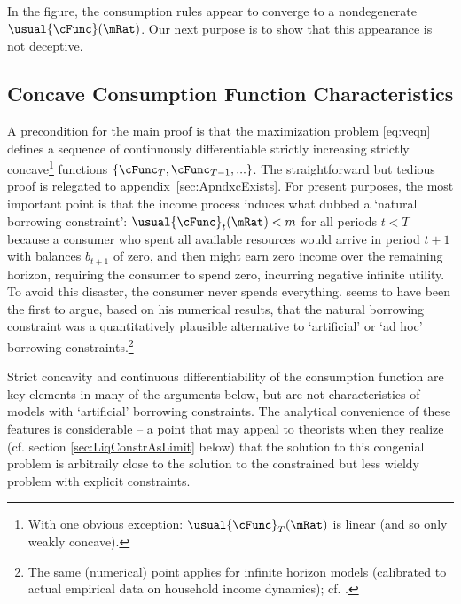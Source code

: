 \documentclass[BufferStockTheory]{subfiles}
\begin{document}
\hypertarget{Calibration}{}



\hypertarget{Symbols}{}



\providecommand{\figName}{Convergence-of-the-Consumption-Rules} %
\providecommand{\figFile}{cFuncsConverge} %
\hypertarget{\figFile}{}
\hypertarget{\figName}{}

In the figure, the consumption rules appear to converge to a nondegenerate $\usual{\cFunc}(\mRat)$.  
Our next purpose is to show that this appearance is not deceptive.

\hypertarget{Concave-Consumption-Function-Characteristics}{}
\subsection{Concave Consumption Function Characteristics}\label{sec:cExists}

A precondition for the main proof is that the maximization problem \eqref{eq:veqn} defines a sequence of continuously differentiable strictly increasing strictly concave\footnote{With one obvious exception: $\usual{\cFunc}_{T}(\mRat)$ is linear (and so only weakly concave).} functions $\{\cFunc_{T},\cFunc_{T-1},...\}$.  The straightforward but tedious proof is relegated to appendix~\ref{sec:ApndxcExists}.  For present purposes, the most important point is that the income process induces what \cite{aiyagari:ge} dubbed a `natural borrowing constraint':  $\usual{\cFunc}_{t}(\mRat) < m$ for all periods $t < T$ because a consumer who spent all available resources would arrive in period $t+1$ with balances $b_{t+1}$ of zero, and then might earn zero income over the remaining horizon, requiring the consumer to spend zero, incurring negative infinite utility.  To avoid this disaster, the consumer never spends everything.  \cite{zeldesStochastic} seems to have been the first to argue, based on his numerical results, that the natural borrowing constraint was a quantitatively plausible alternative to `artificial' or `ad hoc' borrowing constraints.\footnote{The same (numerical) point applies for infinite horizon models (calibrated to actual empirical data on household income dynamics); cf. \cite{carrollBrookings}.}

Strict concavity and continuous differentiability of the consumption function are key elements in many of the arguments below, but are not characteristics of models with `artificial' borrowing constraints.  The analytical convenience of these features is considerable -- a point that may appeal to theorists when they realize (cf. section \ref{sec:LiqConstrAsLimit} below) that the solution to this congenial problem is arbitraily close to the solution to the constrained but less wieldy problem with explicit constraints.
\end{document}
